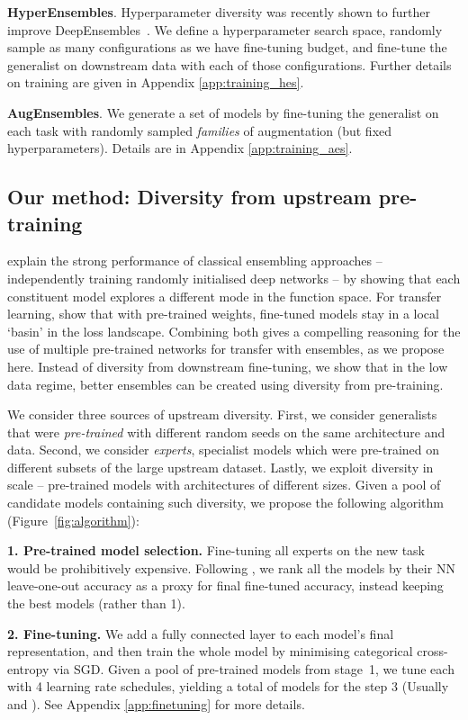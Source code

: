 \documentclass{article} \usepackage{iclr2021_conference,times}
\begin{document}
\textbf{HyperEnsembles}.
Hyperparameter diversity was recently shown to further improve DeepEnsembles~\citep{wenzel2020hyperparameter}.
We define a hyperparameter search space, randomly sample as many configurations as we have fine-tuning budget, and fine-tune the generalist on downstream data with each of those configurations. Further details on training are given in Appendix  \ref{app:training_hes}.

\textbf{AugEnsembles}.
We generate a set of models by fine-tuning the generalist on each task with randomly sampled \textit{families} of augmentation (but fixed hyperparameters). Details are in Appendix \ref{app:training_aes}.


\subsection{Our method: Diversity from upstream pre-training}
\citet{fort2019deep} explain the strong performance of classical ensembling approaches -- independently training randomly initialised deep networks -- by showing that each constituent model explores a different mode in the function space.
For transfer learning, \citet{neyshabur2020transferred} show that with pre-trained weights, fine-tuned models stay in a local `basin' in the loss landscape. Combining both gives a compelling reasoning for the use of multiple pre-trained networks for transfer with ensembles, as we propose here. Instead of diversity from downstream fine-tuning, we show that in the low data regime, better ensembles can be created using diversity from pre-training.

We consider three sources of upstream diversity.
First, we consider generalists that were \textit{pre-trained} with different random seeds on the same architecture and data.
Second, we consider \textit{experts}, specialist models which were pre-trained on different subsets of the 
large upstream dataset.
Lastly, we exploit diversity in scale -- pre-trained models with architectures of different sizes.
Given a pool of candidate models containing such diversity, we propose the following algorithm (Figure~\ref{fig:algorithm}):

\textbf{1. Pre-trained model selection.}
Fine-tuning all experts on the new task would be prohibitively expensive. Following \citet{puigcerver2020experts}, we rank all the models by their NN leave-one-out accuracy as a proxy for final fine-tuned accuracy, instead keeping the  best models (rather than 1).

\textbf{2. Fine-tuning.}
We add a fully connected layer to each model's final representation, and then train the whole model by minimising categorical cross-entropy via SGD.
Given a pool of  pre-trained models from stage~1, we tune each with 4 learning rate schedules, yielding a total of  models for the step 3 (Usually  and ). See Appendix \ref{app:finetuning} for more details.
\end{document}
